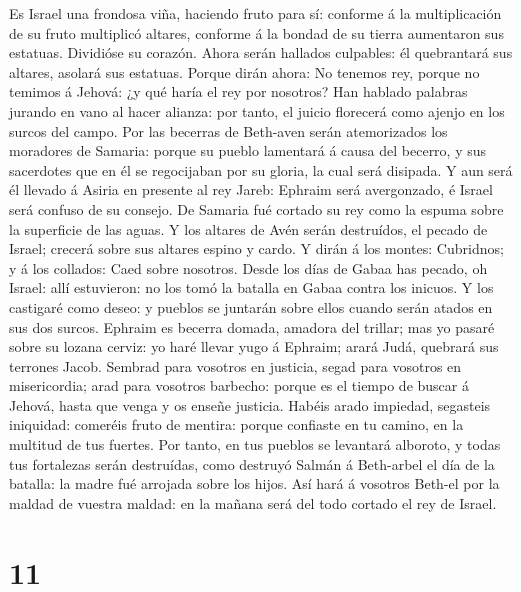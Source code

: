  Es Israel una frondosa viña, haciendo fruto para sí:
conforme á la multiplicación de su fruto multiplicó altares, conforme á
la bondad de su tierra aumentaron sus estatuas.  Dividióse
su corazón. Ahora serán hallados culpables: él quebrantará sus altares,
asolará sus estatuas.  Porque dirán ahora: No tenemos rey,
porque no temimos á Jehová: ¿y qué haría el rey por nosotros?
 Han hablado palabras jurando en vano al hacer alianza: por
tanto, el juicio florecerá como ajenjo en los surcos del campo.
 Por las becerras de Beth-aven serán atemorizados los
moradores de Samaria: porque su pueblo lamentará á causa del becerro, y
sus sacerdotes que en él se regocijaban por su gloria, la cual será
disipada.  Y aun será él llevado á Asiria en presente al rey
Jareb: Ephraim será avergonzado, é Israel será confuso de su consejo.
 De Samaria fué cortado su rey como la espuma sobre la
superficie de las aguas.  Y los altares de Avén serán
destruídos, el pecado de Israel; crecerá sobre sus altares espino y
cardo. Y dirán á los montes: Cubridnos; y á los collados: Caed sobre
nosotros.  Desde los días de Gabaa has pecado, oh Israel:
allí estuvieron: no los tomó la batalla en Gabaa contra los inicuos.
 Y los castigaré como deseo: y pueblos se juntarán sobre
ellos cuando serán atados en sus dos surcos.  Ephraim es
becerra domada, amadora del trillar; mas yo pasaré sobre su lozana
cerviz: yo haré llevar yugo á Ephraim; arará Judá, quebrará sus terrones
Jacob.  Sembrad para vosotros en justicia, segad para
vosotros en misericordia; arad para vosotros barbecho: porque es el
tiempo de buscar á Jehová, hasta que venga y os enseñe justicia.
 Habéis arado impiedad, segasteis iniquidad: comeréis fruto
de mentira: porque confiaste en tu camino, en la multitud de tus
fuertes.  Por tanto, en tus pueblos se levantará alboroto,
y todas tus fortalezas serán destruídas, como destruyó Salmán á
Beth-arbel el día de la batalla: la madre fué arrojada sobre los hijos.
 Así hará á vosotros Beth-el por la maldad de vuestra
maldad: en la mañana será del todo cortado el rey de Israel.

\hypertarget{section-10}{%
\section{11}\label{section-10}}

